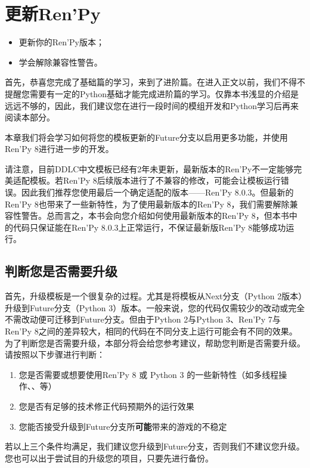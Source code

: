 \chapter{更新Ren'Py}

\begin{ChapterGoals}
    \begin{itemize}
        \item 更新你的Ren'Py版本；
        \item 学会解除兼容性警告。
    \end{itemize}
\end{ChapterGoals}

首先，恭喜您完成了基础篇的学习，来到了进阶篇。在进入正文以前，我们不得不提醒您需要有一定的Python基础才能完成进阶篇的学习。仅靠本书浅显的介绍是远远不够的，因此，我们建议您在进行一段时间的模组开发和Python学习后再来阅读本部分。

本章我们将会学习如何将您的模板更新的Future分支以启用更多功能，并使用Ren'Py 8进行进一步的开发。

\begin{Warning}
    请注意，目前DDLC中文模板已经有2年未更新，最新版本的Ren'Py不一定能够完美适配模板。若Ren'Py 8后续版本进行了不兼容的修改，可能会让模板运行错误。因此我们推荐您使用最后一个确定适配的版本——Ren'Py 8.0.3。但最新的Ren'Py 8也带来了一些新特性，为了使用最新版本的Ren'Py 8，我们需要解除兼容性警告。总而言之，本书会向您介绍如何使用最新版本的Ren'Py 8，但本书中的代码只保证能在Ren'Py 8.0.3上正常运行，不保证最新版Ren'Py 8能够成功运行。
\end{Warning}

\section{判断您是否需要升级}
首先，升级模板是一个很复杂的过程。尤其是将模板从Next分支（Python 2版本）升级到Future分支（Python 3）版本。一般来说，您的代码仅需较少的改动或完全不需改动便可迁移到Future分支。但由于Python 2与Python 3、Ren'Py 7与Ren'Py 8之间的差异较大，相同的代码在不同分支上运行可能会有不同的效果。为了判断您是否需要升级，本部分将会给您参考建议，帮助您判断是否需要升级。
请按照以下步骤进行判断：
\begin{enumerate}
    \item 您是否需要或想要使用Ren'Py 8 或 Python 3 的一些新特性（如多线程操作、、等）
    \item 您是否有足够的技术修正代码预期外的运行效果
    \item 您能否接受升级到Future分支所\textbf{可能}带来的游戏的不稳定
\end{enumerate}
若以上三个条件均满足，我们建议您升级到Future分支，否则我们不建议您升级。您也可以出于尝试目的升级您的项目，只要先进行备份。

